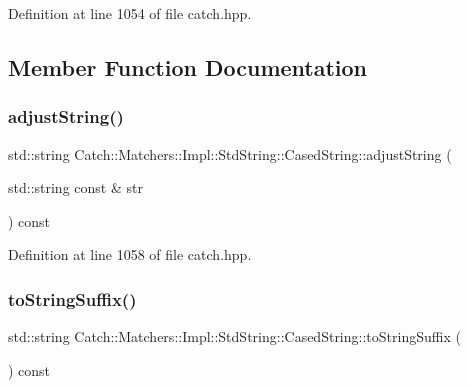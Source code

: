 Definition at line 1054 of file catch.\+hpp.



\subsection{Member Function Documentation}
\hypertarget{struct_catch_1_1_matchers_1_1_impl_1_1_std_string_1_1_cased_string_a8117fdcee8fd8a8e5001b38e0bd19848}{}\label{struct_catch_1_1_matchers_1_1_impl_1_1_std_string_1_1_cased_string_a8117fdcee8fd8a8e5001b38e0bd19848} 
\subsubsection{\texorpdfstring{adjust\+String()}{adjustString()}}
{\footnotesize\ttfamily std\+::string Catch\+::\+Matchers\+::\+Impl\+::\+Std\+String\+::\+Cased\+String\+::adjust\+String (\begin{DoxyParamCaption}\item[{std\+::string const \&}]{str }\end{DoxyParamCaption}) const\hspace{0.3cm}{\ttfamily [inline]}}



Definition at line 1058 of file catch.\+hpp.

\hypertarget{struct_catch_1_1_matchers_1_1_impl_1_1_std_string_1_1_cased_string_ac12f719f5d1aeb28a2bc2f6cc8b95b37}{}\label{struct_catch_1_1_matchers_1_1_impl_1_1_std_string_1_1_cased_string_ac12f719f5d1aeb28a2bc2f6cc8b95b37} 
\subsubsection{\texorpdfstring{to\+String\+Suffix()}{toStringSuffix()}}
{\footnotesize\ttfamily std\+::string Catch\+::\+Matchers\+::\+Impl\+::\+Std\+String\+::\+Cased\+String\+::to\+String\+Suffix (\begin{DoxyParamCaption}{ }\end{DoxyParamCaption}) const\hspace{0.3cm}{\ttfamily [inline]}}



